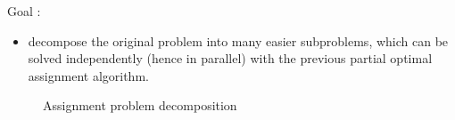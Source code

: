 \documentclass[11pt]{beamer}
\begin{document}
\begin{frame}
Goal : 
\begin{itemize}
\item {\color{red}decompose the original problem into many easier subproblems}, which can be solved {\color{red}independently} (hence in parallel) with the previous partial optimal assignment algorithm.
\end{itemize}

\begin{figure}[H]
\caption{Assignment problem decomposition}\label{decomp_fig}
\end{figure}

\end{frame}
\end{document}
